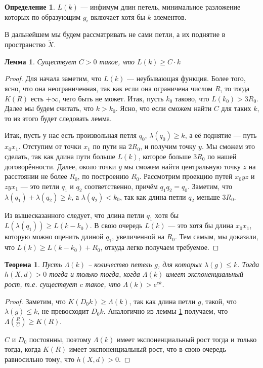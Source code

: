 \documentclass[11pt]{article}
\theoremstyle{definition}
\newtheorem{defin}{Определение}%
\theoremstyle{plain}
\theoremstyle{plain}
\newtheorem{lemma}{Лемма}
\newtheorem{theorem}{Теорема}
\def\leq{\leqslant}
\def\geq{\geqslant}
\def\wt#1{\widetilde{#1}}
\begin{document}
\begin{defin}
	$L(k)$ --- инфимум длин петель, минимальное разложение которых по образующим $g_i$ включает хотя бы $k$ элементов.
\end{defin}
В дальнейшем мы будем рассматривать не сами петли, а их поднятие в пространство $\wt{X}$.

\begin{lemma}\label{l_C}
Существует $C > 0$ такое, что $L(k) \geq C \cdot k$
\end{lemma}
\begin{proof}
Для начала заметим, что $L(k)$ --- неубывающая функция. Более того, ясно, что она неограниченная, так как если она ограничена числом $R$, 
то тогда $K(R)$ есть $+\infty$, чего быть не может. Итак, пусть $k_0$ таково, что $L(k_0) > 3 R_0$.
Далее мы будем считать, что $k > k_0$. Ясно, что если сможем найти $C$ для таких $k$, то из этого будет следовать лемма.

Итак, пусть у нас есть произвольная петля $q_0$, $\lambda(q_0) \geq k$, а её поднятие --- путь $x_0 x_1$.
Отступим от точки $x_1$ по пути на $2R_0$, и получим точку $y$.
Мы сможем это сделать, так как длина пути больше $L(k)$, которое больше $3R_0$ по нашей договорённости.
Далее, около точки $y$ мы сможем найти центральную точку $z$ на расстоянии не более $R_0$, по построению $R_0$.
Рассмотрим проекцию путей $x_0yz$ и $zyx_1$ --- это петли $q_1$ и $q_2$ соответственно, причём $q_1q_2 = q_0$.
Заметим, что $\lambda(q_1) + \lambda(q_2) \geq k$, а $\lambda(q_2) < k_0$, так как длина петли $q_2$ меньше $3R_0$. 

Из вышесказанного следует, что длина петли $q_1$ хотя бы $L(\lambda(q_1)) \geq L(k-k_0)$.
В свою очередь $L(k)$ --- это хотя бы длина $x_0x_1$, которую можно оценить длиной $q_1$, увеличенной на $R_0$. 
Тем самым, мы доказали, что $L(k) \geq L(k-k_0) + R_0$, откуда легко получаем требуемое.
\end{proof}


\begin{theorem}
Пусть $\Lambda(k)$ -- количество петель $g$, для которых $\lambda(g) \leq k$. 
Тогда $h(X, d) > 0$ тогда и только тогда, когда $\Lambda(k)$ имеет экспоненциальный рост, 
т.е. существует $c$ такое, что $\Lambda(k) > e^{ck}$.
\end{theorem}

\begin{proof}
Заметим, что $K(D_0 k) \geq \Lambda(k)$, так как длина петли $g$, такой, что $\lambda(g) \leq k$, не превосходит $D_0 k$.
Аналогично из леммы \ref{l_C} получаем, что $\Lambda(\frac{R}{C}) \geq K(R)$.

$C$ и $D_0$ постоянны, поэтому $\Lambda(k)$ имеет экспоненциальный рост тогда и только тогда, когда $K(R)$ имеет экспоненциальный рост,
что в свою очередь равносильно тому, что $h(X, d) > 0$.

\end{proof}
\end{document}
